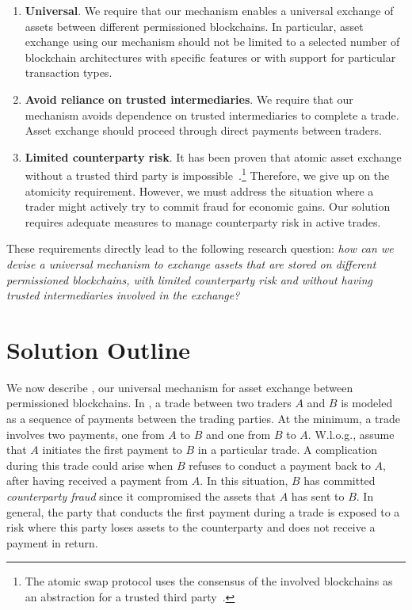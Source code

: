 \begin{enumerate}
	\item \textbf{Universal}. We require that our mechanism enables a universal exchange of assets between different permissioned blockchains.
	In particular, asset exchange using our mechanism should not be limited to a selected number of blockchain architectures with specific features or with support for particular transaction types.
	\item \textbf{Avoid reliance on trusted intermediaries}. We require that our mechanism avoids dependence on trusted intermediaries to complete a trade. Asset exchange should proceed through direct payments between traders.
	\item \textbf{Limited counterparty risk}. It has been proven that atomic asset exchange without a trusted third party is impossible~\cite{pagnia1999impossibility}.\footnote{The atomic swap protocol uses the consensus of the involved blockchains as an abstraction for a trusted third party~\cite{zamyatin2019sok}.}
	Therefore, we give up on the atomicity requirement.
	However, we must address the situation where a trader might actively try to commit fraud for economic gains.
	Our solution requires adequate measures to manage counterparty risk in active trades.
\end{enumerate}

These requirements directly lead to the following research question: \emph{how can we devise a universal mechanism to exchange assets that are stored on different permissioned blockchains, with limited counterparty risk and without having trusted intermediaries involved in the exchange?}

\section{Solution Outline}
\label{sec:solution_outline}
We now describe \ModelName{}, our universal mechanism for asset exchange between permissioned blockchains.
In \ModelName{}, a trade between two traders $ A $ and $ B $ is modeled as a sequence of payments between the trading parties.
At the minimum, a trade involves two payments, one from $ A $ to $ B $ and one from $ B $ to $ A $.
W.l.o.g., assume that $ A $ initiates the first payment to $ B $ in a particular trade.
A complication during this trade could arise when $ B $ refuses to conduct a payment back to $ A $, after having received a payment from $ A $.
In this situation, $ B $ has committed \emph{counterparty fraud} since it compromised the assets that $ A $ has sent to $ B $.
In general, the party that conducts the first payment during a trade is exposed to a risk where this party loses assets to the counterparty and does not receive a payment in return.

